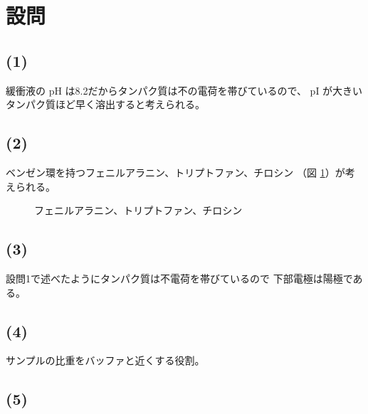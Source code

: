 \documentclass[a4paper]{ltjsarticle}
\begin{document}
\section{設問}

\subsection{(1)}

緩衝液の pH は8.2だからタンパク質は不の電荷を帯びているので、
pI が大きいタンパク質ほど早く溶出すると考えられる。

\subsection{(2)}

ベンゼン環を持つフェニルアラニン、トリプトファン、チロシン
（図 \ref{fig:amino}）が考えられる。

\begin{figure}[!hbtp]
\endminipage\hfill
{}
\endminipage\hfill
{}
\endminipage
\centering\caption{フェニルアラニン、トリプトファン、チロシン}
\label{fig:amino}
\end{figure}

\subsection{(3)}

設問1で述べたようにタンパク質は不電荷を帯びているので
下部電極は陽極である。

\subsection{(4)}

サンプルの比重をバッファと近くする役割。

\subsection{(5)}
\end{document}
